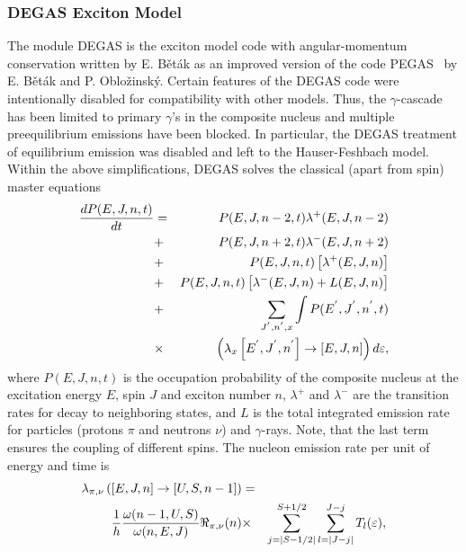 
\subsubsection{DEGAS Exciton Model\label{DEGAS}}

The module DEGAS%
 is the exciton model code with angular-momentum conservation
written by E. B\v{e}t\'{a}k as an improved version of the code
PEGAS~\cite{Degas} by E. B\v{e}t\'{a}k and P. Oblo\v{z}insk\'{y}.
Certain features of the DEGAS code were
intentionally disabled for compatibility with other models.
Thus, the $\gamma $-cascade has been limited to primary $\gamma $'s in the
composite nucleus and multiple preequilibrium emissions have been blocked.
In particular, the DEGAS treatment of equilibrium emission was disabled and
left to the Hauser-Feshbach%
 model. %
Within the above simplifications, DEGAS%
 solves the classical (apart from spin) master equations
\begin{eqnarray}
\label{mastereq}
\frac{dP(E,J,n,t)}{dt} &=&P(E,J,n-2,t)\lambda ^{+}(E,J,n-2)  \notag \\
&+&P(E,J,n+2,t)\lambda ^{-}(E,J,n+2)  \notag \\
&+&P(E,J,n,t)\left[ \lambda ^{+}(E,J,n)\right]  \notag \\
&+&P(E,J,n,t)\left[ \lambda ^{-}(E,J,n)+L(E,J,n)\right]  \notag \\
&+&\sum_{J^{^{\prime }},n^{^{\prime }},x}\int P(E^{^{\prime }},J^{^{\prime
}},n^{^{\prime }},t) \notag \\
&\times& \left( \lambda _{x} \left[ E^{^{\prime }},J^{^{\prime }},n^{^{\prime }}\right]
\rightarrow \left[ E,J,n\right] \right) d\varepsilon ,
\end{eqnarray}%
\noindent where $P(E,J,n,t)$ is the occupation probability of the composite
nucleus at the excitation energy $E$, spin $J$ and exciton number $n$, $%
\lambda ^{+}$ and $\lambda ^{-}$ are the transition rates for decay to
neighboring states, and $L$ is the total integrated emission rate for
particles (protons $\pi $ and neutrons $\nu $) and $\gamma $-rays. Note,
that the last term ensures the coupling of different spins.
The nucleon emission rate per unit of energy and time is
\begin{eqnarray}
\lambda _{\pi ,\nu }\left( \left[ E,J,n\right] \rightarrow \left[ U,S,n-1%
\right] \right) &=& \\
\frac{1}{h}\frac{\omega (n-1,U,S)}{\omega (n,E,J)}\Re _{\pi ,\nu }(n) &\times
&\sum_{j=\mid S-1/2\mid }^{S+1/2}\sum_{l=\mid J-j\mid
}^{J-j}T_{l}(\varepsilon ),  \notag
\end{eqnarray}%
